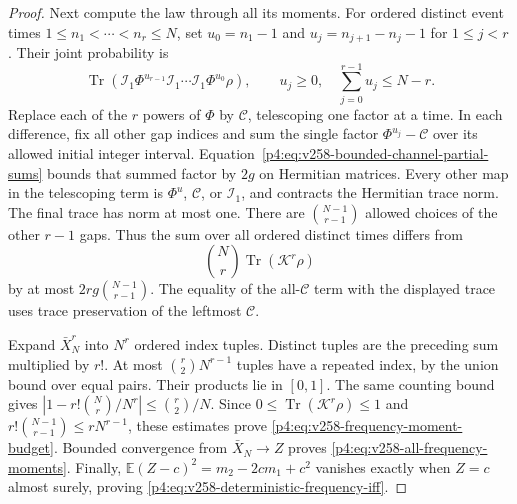 \documentclass[12pt,a4paper]{article}
\begin{document}
\begin{proof}
Next compute the law through all its moments. For ordered distinct
event times $1\le n_1<\cdots<n_r\le N$, set
$u_0=n_1-1$ and $u_j=n_{j+1}-n_j-1$ for $1\le j<r$. Their joint
probability is
\[
 \operatorname{Tr}\!\left(
 \mathcal I_1\Phi^{u_{r-1}}\mathcal I_1\cdots
        \mathcal I_1\Phi^{u_0}\rho\right),
 \qquad u_j\ge0,\quad\sum_{j=0}^{r-1}u_j\le N-r.
\]
Replace each of the $r$ powers of $\Phi$ by $\mathcal C$, telescoping
one factor at a time. In each difference, fix all other gap indices and
sum the single factor $\Phi^{u_j}-\mathcal C$ over its allowed initial
integer interval. Equation~\eqref{p4:eq:v258-bounded-channel-partial-sums}
bounds that summed factor by $2g$ on Hermitian matrices. Every other
map in the telescoping term is $\Phi^u$, $\mathcal C$, or
$\mathcal I_1$, and contracts the Hermitian trace norm. The final trace
has norm at most one. There are
$\binom{N-1}{r-1}$ allowed choices of the other $r-1$ gaps. Thus the
sum over all ordered distinct times differs from
\[
 \binom Nr\operatorname{Tr}(\mathcal K^r\rho)
\]
by at most $2rg\binom{N-1}{r-1}$. The equality of the all-$\mathcal C$
term with the displayed trace uses trace preservation of the leftmost
$\mathcal C$.

Expand $\bar X_N^r$ into $N^r$ ordered index tuples. Distinct tuples
are the preceding sum multiplied by $r!$. At most
$\binom r2N^{r-1}$ tuples have a repeated index, by the union bound
over equal pairs. Their products lie in $[0,1]$. The same counting
bound gives
$|1-r!\binom Nr/N^r|\le\binom r2/N$.
Since $0\le\operatorname{Tr}(\mathcal K^r\rho)\le1$ and
$r!\binom{N-1}{r-1}\le rN^{r-1}$, these estimates prove
\eqref{p4:eq:v258-frequency-moment-budget}. Bounded convergence from
$\bar X_N\to Z$ proves \eqref{p4:eq:v258-all-frequency-moments}.
Finally,
$\mathbb E(Z-c)^2=m_2-2cm_1+c^2$ vanishes exactly when $Z=c$ almost
surely, proving \eqref{p4:eq:v258-deterministic-frequency-iff}.
\end{proof}
\end{document}
